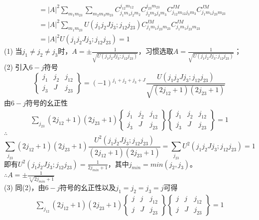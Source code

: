 \documentclass[12pt]{article}
\numberwithin{equation}{section}	 %
\begin{document}
\begin{spacing}{1.5}
\begin{equation}
\begin{aligned}
&= \left|A\right|^{2} \sum_{m_{1}m_{23}} \sum_{m_{2}m_{3}m_{23}} C^{j_{12}m_{12}}_{j_{1}m_{1}j_{2}m_{2}}C^{j_{23}m_{23}}_{j_{2}m_{2}j_{3}m_{3}} C^{JM}_{j_{12}m_{12}j_{3}m_{3}}C^{JM}_{j_{1}m_{1}j_{23}m_{23}} \\
&= \left|A\right|^{2} \sum_{m_{1}m_{23}} U(j_{1}j_{2}Jj_{3};j_{12}j_{23}) C^{JM}_{j_{1}m_{1}j_{23}m_{23}} C^{JM}_{j_{1}m_{1}j_{23}m_{23}}\\
&= \left|A\right|^{2} U(j_{1}j_{2}Jj_{3};j_{12}j_{23}) = 1
\end{aligned}
\end{equation}
(1) 当$j_{1}\ne j_{2}\ne j_{3}$时，$\displaystyle A=\pm\frac{1}{\sqrt{U(j_{1}j_{2}Jj_{3};j_{12}j_{23})}}$，习惯选取$\displaystyle A=\frac{1}{\sqrt{U(j_{1}j_{2}Jj_{3};j_{12}j_{23})}}$；\\
(2) 引入$6-j$符号
\begin{equation}
\begin{Bmatrix} j_{1} & j_{2} & j_{12} \\ j_{3} & J & j_{23} \end{Bmatrix} = (-1)^{j_{1}+j_{2}+j_{3}+J}\frac{U(j_{1}j_{2}Jj_{3};j_{12}j_{23})}{\sqrt{(2j_{12}+1)(2j_{23}+1)}}
\end{equation}
由$6-j$符号的幺正性
\begin{align}
\sum_{j_{23}}(2j_{12}+1)(2j_{23}+1)\begin{Bmatrix} j_{1} & j_{2} & j_{12} \\ j_{3} & J & j_{23} \end{Bmatrix}\begin{Bmatrix} j_{1} & j_{2} & j_{12} \\ j_{3} & J & j_{23} \end{Bmatrix} = 1
\end{align}
$\therefore$
\begin{equation}
\sum_{j_{23}}(2j_{12}+1)(2j_{23}+1) \frac{U^{2}(j_{1}j_{2}Jj_{3};j_{12}j_{23})}{(2j_{12}+1)(2j_{23}+1)}=\sum_{j_{23}}U^{2}(j_{1}j_{2}Jj_{3};j_{12}j_{23})=1
\end{equation}
即有$\displaystyle U^{2}(j_{1}j_{2}Jj_{3};j_{12}j_{23}) = \frac{1}{2j_{min}+1}$，其中$\displaystyle j_{min}=min(j_{2},j_{3})$。\\
$\therefore \displaystyle A = \pm\frac{1}{\sqrt[4]{2j_{min}+1}}$ \\
(3) 同(2)，由$6-j$符号的幺正性以及$\displaystyle j_{1} = j_{2} = j_{3} = j$可得
\begin{align}
\sum_{j_{12}}(2j_{12}+1)(2j_{23}+1)\begin{Bmatrix} j & j & j_{12} \\ j & J & j_{23} \end{Bmatrix}\begin{Bmatrix} j & j & j_{12} \\ j & J & j_{23} \end{Bmatrix} = 1

\end{align}
\end{spacing}
\end{document}
